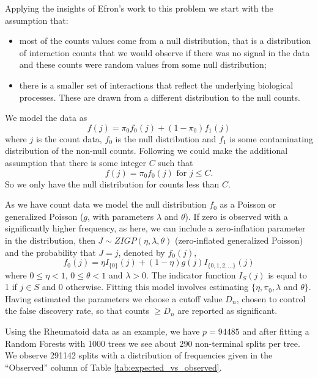 \documentclass[preprint,12pt,3p]{elsarticle}
\begin{document}
Applying the insights of Efron's work to this problem we start with the assumption that:
\begin{itemize}
\item most of the counts values come from a null distribution, that is a distribution of interaction
  counts that we would observe if there was no signal in the data and these counts were random values from some null distribution;
\item there is a smaller set of interactions that reflect the underlying biological processes. These are drawn from a
  different distribution to the null counts.
\end{itemize}

We model the data as 
\[
f (j ) = \pi_0 f_0 (j ) + (1 - \pi_0 )f_1 (j )
\]
where $j$ is the count data, $f_0$ is the null distribution and $f_1$ is some contaminating distribution of the
non-null counts. Following \cite{Gauran.et.al.2018} we could make the additional assumption that there is some integer $C$ such that
\begin{equation}
  f(j ) = \pi_0 f_0 (j ) \textrm{ for } j \leq C.
\label{eqn:C}  
\end{equation}
So we only have the null distribution for counts less than $C.$ 

As we have count data we model the null distribution $f_0$ as a Poisson or  generalized Poisson ($g$, with parameters
$\lambda$ and $\theta$).
If zero is observed with a significantly higher frequency, as here, we can include a zero-inflation parameter in the
distribution, then $J \sim ZIGP(\eta, \lambda, \theta)$ (zero-inflated generalized Poisson) and the probability that $J = j$, denoted by $f_0 (j)$, 
\[
  f_0(j) = \eta I_{\{0\}} (j) + (1 - \eta) g(j) I_{\{0,1,2,\ldots \}} (j)
\]
where $0 \leq \eta < 1$, $0 \leq \theta < 1$ and $\lambda > 0$. The indicator function
$I_S (j)$ is equal to 1 if $j \in  S$ and 0 otherwise. Fitting this model involves estimating $\{ \eta, \pi_0,
\lambda$ and $\theta \}$. Having estimated the parameters we choose a cutoff value $D_n$, chosen to control the false
discovery rate, so that counts $\geq  D_n$ are reported as significant.


Using the Rheumatoid data as an example, we have $p= 94485$ and after fitting a Random Forests with
1000 trees we see about 290 non-terminal splits per tree. We observe 291142 splits with a distribution of frequencies
given in the ``Observed'' column of Table \ref{tab:expected_vs_observed}.
\end{document}

